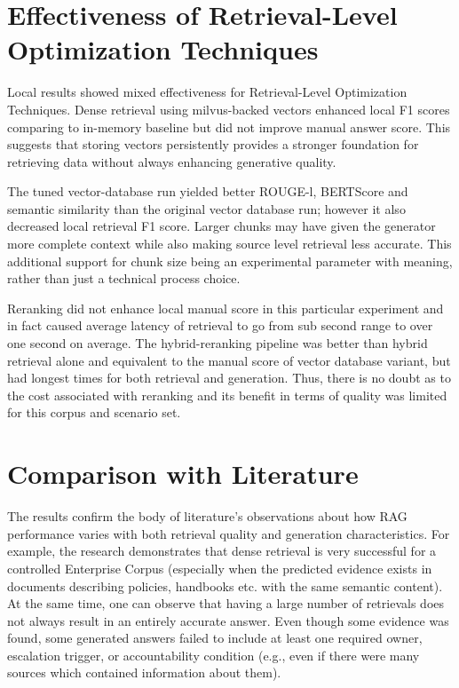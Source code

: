 
\section{Effectiveness of Retrieval-Level Optimization Techniques}
Local results showed mixed effectiveness for Retrieval-Level Optimization Techniques. Dense retrieval using milvus-backed vectors enhanced local F1 scores comparing to in-memory baseline but did not improve manual answer score. This suggests that storing vectors persistently provides a stronger foundation for retrieving data without always enhancing generative quality.

The tuned vector-database run yielded better ROUGE-l, BERTScore and semantic similarity than the original vector database run; however it also decreased local retrieval F1 score. Larger chunks may have given the generator more complete context while also making source level retrieval less accurate. This additional support for chunk size being an experimental parameter with meaning, rather than just a technical process choice.

Reranking did not enhance local manual score in this particular experiment and in fact caused average latency of retrieval to go from sub second range to over one second on average. The hybrid-reranking pipeline was better than hybrid retrieval alone and equivalent to the manual score of vector database variant, but had longest times for both retrieval and generation. Thus, there is no doubt as to the cost associated with reranking and its benefit in terms of quality was limited for this corpus and scenario set.


\section{Comparison with Literature}
The results confirm the body of literature's observations about how RAG performance varies with both retrieval quality and generation characteristics. For example, the research demonstrates that dense retrieval is very successful for a controlled Enterprise Corpus (especially when the predicted evidence exists in documents describing policies, handbooks etc. with the same semantic content). At the same time, one can observe that having a large number of retrievals does not always result in an entirely accurate answer. Even though some evidence was found, some generated answers failed to include at least one required owner, escalation trigger, or accountability condition (e.g., even if there were many sources which contained information about them). 

